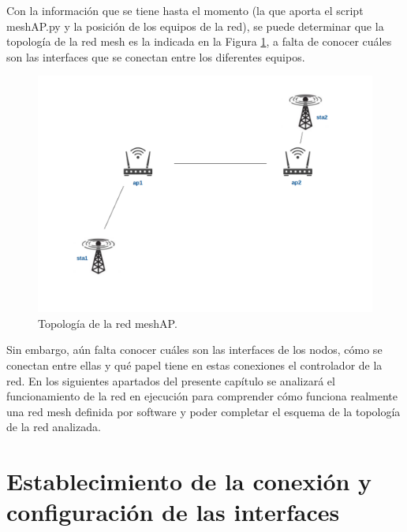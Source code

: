 \documentclass[a4paper,12pt,twoside,spanish]{book}
\begin{document}
Con la información que se tiene hasta el momento (la que aporta el script meshAP.py y la posición de los equipos de la red), se puede determinar que la topología de la red mesh es la indicada en la Figura \ref{fig:topo_inicial}, a falta de conocer cuáles son las interfaces que se conectan entre los diferentes equipos.\par

	\begin{figure}[!h]
		\centering
		\includegraphics[scale=.4]{Figuras/topo_inicial.png}
		\caption{Topología de la red meshAP.}
		\label{fig:topo_inicial}
	\end{figure}

Sin embargo, aún falta conocer cuáles son las interfaces de los nodos, cómo se conectan entre ellas y qué papel tiene en estas conexiones el controlador de la red. En los siguientes apartados del presente capítulo se analizará el funcionamiento de la red en ejecución para comprender cómo funciona realmente una red mesh definida por software y poder completar el esquema de la topología de la red analizada.\par







\section{Establecimiento de la conexión y configuración de las interfaces}
\end{document}
